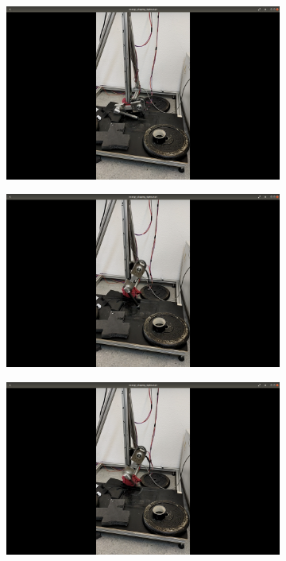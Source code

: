 \documentclass[onecolumn, letter paper]{report}
\begin{document}
\begin{figure}[htb!]
    \centering
    \begin{subfigure}{.24\textwidth}
    \includegraphics[width=\textwidth, trim={25cm 10cm 25cm 10cm}, clip]{figures/0.4m/p4m1.png}
    \end{subfigure}
    \begin{subfigure}{.24\textwidth}
    \includegraphics[width=\textwidth, trim={25cm 10cm 25cm 10cm}, clip]{figures/0.4m/p4m2.png}
    \end{subfigure}
    \begin{subfigure}{.24\textwidth}
    \includegraphics[width=\textwidth, trim={25cm 10cm 25cm 10cm}, clip]{figures/0.4m/p4m3.png}

\end{subfigure}
\end{figure}
\end{document}
